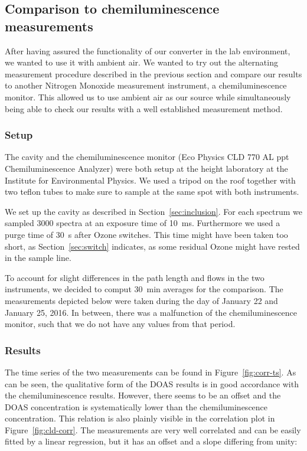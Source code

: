 \subsection{Comparison to chemiluminescence measurements}
\label{sec:cld}

After having assured the functionality of our converter in the lab
environment, we wanted to use it with ambient air. We wanted to try
out the alternating measurement procedure described in the previous
section and compare our results to another Nitrogen Monoxide
measurement instrument, a chemiluminescence monitor. This allowed us
to use ambient air as our  source while simultaneously being
able to check our results with a well established measurement method.

\subsubsection{Setup}
\label{sec:cld-setup}

The cavity and the chemiluminescence monitor (Eco Physics CLD 770 AL
ppt Chemiluminescence  Analyzer) were both setup at the
height laboratory at the Institute for Environmental Physics. We used
a tripod on the roof together with two teflon tubes to make sure to
sample at the same spot with both instruments.

We set up the cavity as described in Section~\ref{sec:inclusion}. For
each spectrum we sampled 3000 spectra at an exposure time of
\SI{10}{\milli\second}. Furthermore we used a purge time of
\SI{30}{\second} after Ozone switches. This time might have been taken
too short, as Section~\ref{sec:switch} indicates, as some residual
Ozone might have rested in the sample line.

To account for slight differences in the path length and flows in the
two instruments, we decided to comput \SI{30}{\minute} averages for
the comparison. The measurements depicted below were taken during the
day of January 22 and January 25, 2016. In between, there was a
malfunction of the chemiluminescence monitor, such that we do not have
any values from that period.

\subsubsection{Results}
\label{sec:cld-results}

The time series of the two measurements can be found in
Figure~\ref{fig:corr-ts}. As can be seen, the qualitative form of the
DOAS results is in good accordance with the chemiluminescence results.
However, there seems to be an offset and the DOAS concentration is
systematically lower than the chemiluminescence concentration. This
relation is also plainly visible in the correlation plot in
Figure~\ref{fig:cld-corr}. The measurements are very well correlated
and can be easily fitted by a linear regression, but it has an offset
and a slope differing from unity:

